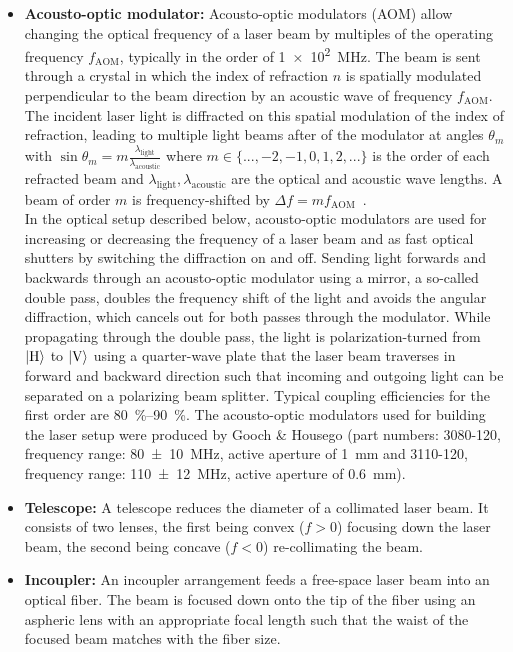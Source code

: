 \begin{itemize}
    \item \textbf{Acousto-optic modulator:} Acousto-optic modulators (AOM) allow changing the optical frequency of a laser beam by multiples of the operating frequency $f_\text{AOM}$, typically in the order of \SI[]{1e2}{\mega\hertz}. The beam is sent through a crystal in which the index of refraction $n$ is spatially modulated perpendicular to the beam direction by an acoustic wave of frequency $f_\text{AOM}$. The incident laser light is diffracted on this spatial modulation of the index of refraction, leading to multiple light beams after of the modulator at angles $\theta_m$ with $\sin \theta_m = m\frac{\lambda_\text{light}}{\lambda_\text{acoustic}}$ where $m \in \{..., -2, -1, 0, 1, 2, ...\}$ is the order of each refracted beam and $\lambda_\text{light}, \lambda_\text{acoustic}$ are the optical and acoustic wave lengths. A beam of order $m$ is frequency-shifted by $\Delta f = mf_\text{AOM}$~\cite{hunsperger_acousto-optic_2002}.\\
    In the optical setup described below, acousto-optic modulators are used for increasing or decreasing the frequency of a laser beam and as fast optical shutters by switching the diffraction on and off. Sending light forwards and backwards through an acousto-optic modulator using a mirror, a so-called double pass, doubles the frequency shift of the light and avoids the angular diffraction, which cancels out for both passes through the modulator. While propagating through the double pass, the light is polarization-turned from $\Ket{\text{H}}$ to $\Ket{\text{V}}$ using a quarter-wave plate that the laser beam traverses in forward and backward direction such that incoming and outgoing light can be separated on a polarizing beam splitter. Typical coupling efficiencies for the first order are \SIrange[]{80}{90}{\percent}. The acousto-optic modulators used for building the laser setup were produced by Gooch \& Housego (part numbers: 3080-120, frequency range: \SI{80(10)}{\mega\hertz}, active aperture of \SI{1}{\milli\meter} and 3110-120, frequency range: \SI{110(12)}{\mega\hertz}, active aperture of \SI{0.6}{\milli\meter}).

    \item \textbf{Telescope:} A telescope reduces the diameter of a collimated laser beam. It consists of two lenses, the first being convex ($f > 0$) focusing down the laser beam, the second being concave ($f < 0$) re-collimating the beam.
    
    \item \textbf{Incoupler:} An incoupler arrangement feeds a free-space laser beam into an optical fiber. The beam is focused down onto the tip of the fiber using an aspheric lens with an appropriate focal length such that the waist of the focused beam matches with the fiber size.
    

\end{itemize}
